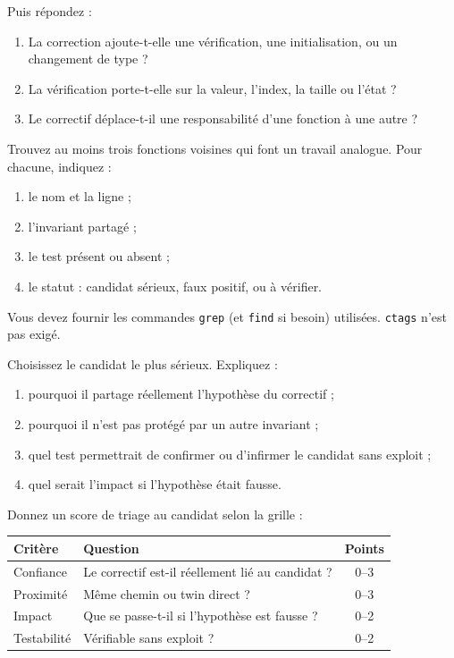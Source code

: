 \documentclass{training-exam}
\begin{document}
Puis répondez :

\begin{enumerate}
  \item La correction ajoute-t-elle une vérification, une initialisation,
        ou un changement de type ?
  \item La vérification porte-t-elle sur la valeur, l'index, la taille ou
        l'état ?
  \item Le correctif déplace-t-il une responsabilité d'une fonction à une
        autre ?
\end{enumerate}



Trouvez au moins trois fonctions voisines qui font un travail analogue.
Pour chacune, indiquez :

\begin{enumerate}
  \item le nom et la ligne ;
  \item l'invariant partagé ;
  \item le test présent ou absent ;
  \item le statut : candidat sérieux, faux positif, ou à vérifier.
\end{enumerate}

Vous devez fournir les commandes \texttt{grep} (et \texttt{find} si besoin)
utilisées. \texttt{ctags} n'est pas exigé.



Choisissez le candidat le plus sérieux. Expliquez :

\begin{enumerate}
  \item pourquoi il partage réellement l'hypothèse du correctif ;
  \item pourquoi il n'est pas protégé par un autre invariant ;
  \item quel test permettrait de confirmer ou d'infirmer le candidat sans
        exploit ;
  \item quel serait l'impact si l'hypothèse était fausse.
\end{enumerate}



Donnez un score de triage au candidat selon la grille :

\begin{center}
\begin{tabularx}{\linewidth}{|l|X|c|}
\hline
\textbf{Critère} & \textbf{Question} & \textbf{Points} \\ \hline
Confiance & Le correctif est-il réellement lié au candidat ? & 0--3 \\ \hline
Proximité & Même chemin ou twin direct ? & 0--3 \\ \hline
Impact & Que se passe-t-il si l'hypothèse est fausse ? & 0--2 \\ \hline
Testabilit\'e & Vérifiable sans exploit ? & 0--2 \\ \hline
\end{tabularx}
\end{center}
\end{document}
